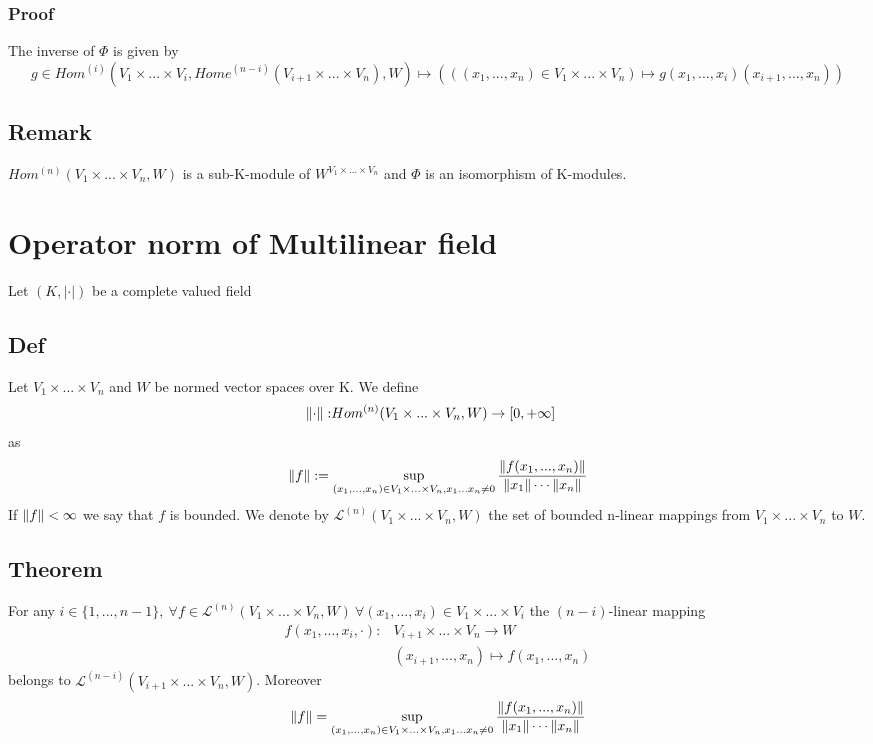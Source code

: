 \documentclass{book}
\newcommand{\abs}[1]{\left\lvert #1 \right\rvert}
\begin{document}
\subsection*{Proof}
The inverse of $\Phi$ is given by $$g\in Hom^{(i)}(V_1\times...\times V_i,Home^{(n-i)}(V_{i+1}\times...\times V_n),W)\mapsto (((x_1,...,x_n)\in V_1\times...\times V_n)\mapsto g(x_1,...,x_i)(x_{i+1},...,x_n))$$
\section{Remark}
$Hom^{(n)}(V_1\times...\times V_n,W)$ is a sub-K-module of $W^{V_1\times...\times V_n}$ and $\Phi$ is an isomorphism of K-modules.
\chapter{Operator norm of Multilinear field}
Let $(K,\abs\cdot)$ be a complete valued field
\section{Def}
Let $V_1\times...\times V_n$ and $W$ be normed vector spaces over K. We define $$\begin{aligned}
    \left\lVert \cdot \right\rVert: &Hom^{(n)}(V_1\times...\times V_n,W)\rightarrow [0,+\infty]
\end{aligned}$$
as $$\begin{aligned}
    \left\lVert f \right\rVert:=\sup\limits_{(x_1,...,x_n)\in V_1\times...\times V_n,x_1...x_n\neq0}\frac{\left\lVert f(x_1,...,x_n) \right\rVert}{\left\lVert x_1 \right\rVert\cdots\left\lVert x_n \right\rVert}
\end{aligned}$$
If $\left\lVert f \right\rVert<\infty$ we say that $f$ is bounded. We denote by $\mathscr{L}^{(n)}(V_1\times...\times V_n,W)$ the set of bounded n-linear mappings from $V_1\times...\times V_n$ to $W$.
\section{Theorem}
For any $i\in \{1,...,n-1\},\  \forall f\in \mathscr{L}^{(n)}(V_1\times...\times V_n,W)\ \forall(x_1,...,x_i)\in V_1\times...\times V_i$ the $(n-i)$-linear mapping $$\begin{aligned}
    f(x_1,...,x_i,\cdot): &V_{i+1}\times...\times V_n\rightarrow W\\
    &(x_{i+1},...,x_n)\mapsto f(x_1,...,x_n)
\end{aligned}$$
belongs to $\mathscr{L}^{(n-i)}(V_{i+1}\times...\times V_n,W)$. Moreover $$\left\lVert f \right\rVert=\sup\limits_{(x_1,...,x_n)\in V_1\times...\times V_n,x_1...x_n\neq0}\frac{\left\lVert f(x_1,...,x_n) \right\rVert}{\left\lVert x_1 \right\rVert\cdots\left\lVert x_n \right\rVert}$$
\end{document}
